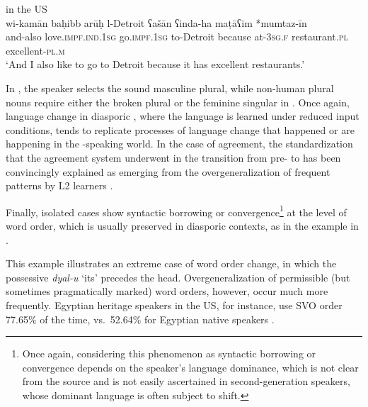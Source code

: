 \documentclass[output=paper]{langsci/langscibook}
\begin{document}
\ea\label{usa}
{ in the US \citep[740]{Albirini2014}}\\
\gll wi-kamān baḥibb arūḥ l-Detroit ʕašān ʕinda-ha maṭāʕim *mumtaz-īn\\
     and-also love.\textsc{impf.ind.1sg} go.\textsc{impf.1sg} to-Detroit because at-\textsc{3sg.f} restaurant.\textsc{pl} excellent-\textsc{pl.m}\\
\glt `And I also like to go to Detroit because it has excellent restaurants.'
\z

In , the speaker selects the sound masculine plural, while non-human plural nouns require either the {broken plural} or the feminine singular in . Once again, {language change} in diasporic , where the language is learned under reduced input conditions, tends to replicate processes of {language change} that happened or are happening in the -speaking world. In the case of {agreement}, the standardization that the {agreement} system underwent in the transition from pre- to   has been convincingly explained as emerging from the overgeneralization of frequent patterns by L2 learners \citep{Belnap1999}.

Finally, isolated cases show syntactic borrowing or {convergence}\footnote{Once again, considering this phenomenon as syntactic borrowing or {convergence} depends on the speaker’s language dominance, which is not clear from the source and is not easily ascertained in second-generation speakers, whose dominant language is often subject to shift.} at the level of {word order}, which is usually preserved in diasporic contexts, as in the example in .


This example illustrates an extreme case of {word order} change, in which the possessive \textit{dyal-u} ‘its’ precedes the head. Overgeneralization of permissible (but sometimes pragmatically marked) word orders, however, occur much more frequently. Egyptian {heritage speakers} in the US, for instance, use SVO order 77.65\% of the time, vs.\ 52.64\% for Egyptian native speakers \citep[280–281]{AlbiriniSaadah2011}.
\end{document}
